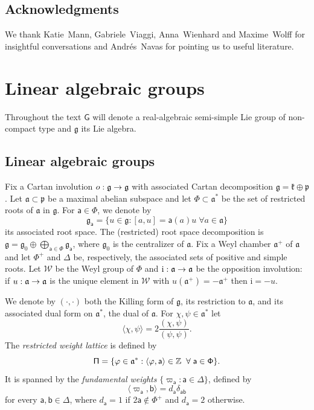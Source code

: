 \documentclass[AHL,Unicode,longabstracts,MathTools]{cedram}
\newcommand{\ii}{\mathrm{i}}
\renewcommand{\sf}[1]{{\mathsf{#1}}}
\newcommand{\sroot}{{\sf{a}}}
\newcommand{\bb}{{\sf{b}}}
\newcommand{\sfG}{\sf{G}}
\newcommand{\poids}{\sf{\Pi}}
\newcommand{\roots}{\mathsf{\Phi}}
\newcommand{\cal}{\mathcal}
\newcommand{\Weyl}{\cal{W}}
\newcommand{\Z}{\mathbb{Z}}
\newcommand{\simple}{{\sf \Delta}}
\newcommand{\peso}{\varpi}
\renewcommand{\/}{\backslash}
\newcommand{\<}{\langle}
\renewcommand{\>}{\rangle}
\newcommand{\p}{\mathfrak{p}}
\renewcommand{\ge}{\mathfrak{g}}
\renewcommand{\a}{\mathfrak{a}}
\renewcommand{\k}{\mathfrak{k}}
\renewcommand*{\to}{\mathchoice{\longrightarrow}{\rightarrow}{\rightarrow}{\rightarrow}}
\let\originalleft\left
\let\originalright\right
\renewcommand{\left}{\mathopen{}\mathclose\bgroup\originalleft}
\renewcommand{\right}{\aftergroup\egroup\originalright}
\let\oldforall\forall
\renewcommand*{\forall}{\mathrel{\oldforall}}
\begin{document}
\subsection*{Acknowledgments}

We thank Katie~Mann, Gabriele~Viaggi, Anna~Wienhard and Maxime~Wolff for insightful conversations and Andrés~Navas for pointing us to useful literature.



\section{Linear algebraic groups}\label{Liegroups}

Throughout the text $\sfG$ will denote a real-algebraic semi-simple Lie group of non-compact type and $\ge$ its Lie algebra.


\subsection{Linear algebraic groups}

Fix a Cartan involution $o:\ge\to\ge$ with associated Cartan decomposition $\ge=\k\oplus\p$. Let $\a\subset\p$ be a maximal abelian subspace and let $\roots\subset\a^*$ be the set of restricted roots of $\a$ in $\ge$. For $\sroot\in\roots$, we denote by
\[
\ge_\sroot=\{u\in\ge:[a,u]=\sroot(a)u\;\forall a\in\a\}
\]
its associated root space. The (restricted) root space decomposition is $\ge=\ge_0\oplus\bigoplus_{\sroot\in\roots}\ge_\sroot$, where $\ge_0$ is the centralizer of $\a$. Fix a Weyl chamber $\a^+$ of $\a$ and let $\roots^+$ and $\simple$ be, respectively, the associated sets of positive and simple roots. Let $\Weyl$ be the Weyl group of $\roots$ and $\ii:\a\to\a$ be the opposition involution: if $u:\a\to\a$ is the unique element in $\Weyl$ with $u(\a^+)=-\a^+$ then $\ii=-u$.

We denote by $(\cdot,\cdot)$ both the Killing form of $\ge$, its restriction to $\a$, and its associated dual form on $\a^*$, the dual of $\a$. For $\chi,\psi\in\a^*$ let
\[
\<\chi,\psi\>=2\frac{(\chi,\psi)}{(\psi,\psi)}.
\]
The \emph{restricted weight lattice} is defined by
\[
\poids=\left\{\varphi\in\a^*:\<\varphi,\sroot\>\in\Z\;\forall\sroot\in\roots\right\}.
\]
It is spanned by the \emph{fundamental weights} $\{\peso_\sroot:\sroot\in\simple\}$, defined by
\begin{equation}\label{pesoFund}
\<\peso_\sroot,\bb\>=d_\sroot\delta_{\sroot\bb}
\end{equation}
for every $\sroot,\bb\in\simple$, where $d_\sroot=1$ if $2\sroot\notin\roots^+$ and $d_\sroot=2$ otherwise.
\end{document}
